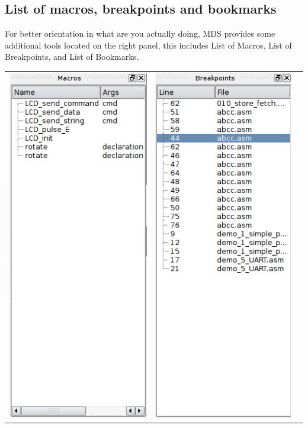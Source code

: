     \subsection{List of macros, breakpoints and bookmarks}
        For better orientation in what are you actually doing, MDS provides some additional tools located on the right
        panel, this includes List of Macros, List of Breakpoints, and List of Bookmarks.

        \begin{table}[h!]
            \begin{tabular}{ccc}
                \includegraphics[width=.3\textwidth]{img/listmacros.png}
                    &
                \includegraphics[width=.3\textwidth]{img/listbreakpoints.png}

\end{tabular}
\end{table}
